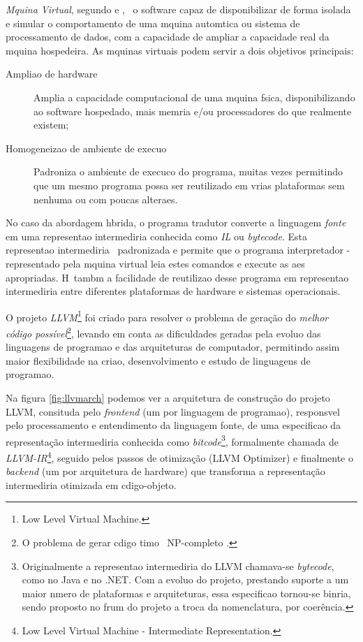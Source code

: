 \emph{M\ah quina Virtual}, segundo \cite{Laureano06} e \cite{IBM11}, \eh\ o software capaz de disponibilizar de forma isolada e  simular o comportamento de uma m\ah quina autom\ah tica ou sistema de processamento de dados, com a capacidade de ampliar a capacidade real da m\ah quina hospedeira.
As m\ah quinas virtuais podem servir a dois objetivos principais:
\begin{description}
\item[Amplia\ca o de hardware] Amplia a capacidade computacional de uma m\ah quina f\ih sica, disponibilizando ao software hospedado, mais mem\oh ria e/ou processadores do que realmente existem;
\item[Homogeneiza\ca o de ambiente de execu\ca o] Padroniza o ambiente de execuc\ca o do programa, muitas vezes permitindo que um mesmo programa possa ser reutilizado em v\ah rias plataformas sem nenhuma ou com poucas altera\co es.
\end{description}

No caso da abordagem h\ih brida, o programa tradutor converte a linguagem \emph{fonte} em uma representa\ca o intermedi\ah ria conhecida como \emph{IL} ou \emph{bytecode}. Esta representa\ca o intermedi\ah ria \eh\ padronizada e permite que o programa interpretador - representado pela m\ah quina virtual leia estes comandos e execute as a\co es apropriadas. H\ah\ tamb\eh m a facilidade de reutiliza\ca o desse programa em representa\ca o intermedi\ah ria entre diferentes plataformas de hardware e sistemas operacionais.

O projeto \emph{LLVM}\footnote{Low Level Virtual Machine.} foi criado para resolver o problema de geração do \emph{melhor código possível}\footnote{O problema de gerar c\oh digo \oh timo \eh\ NP-completo \cite{Aho08}.}, levando em conta as dificuldades geradas pela evolu\ca o das linguagens de programa\ca o e das arquiteturas de computador, permitindo assim maior flexibilidade na cria\ca o, desenvolvimento e estudo de linguagens de programa\ca o.

Na figura \ref{fig:llvmarch} podemos ver a arquitetura de construção do projeto LLVM, consitu\ih da pelo \emph{frontend} (um por linguagem de programa\ca o), respons\ah vel pelo processamento e entendimento da linguagem fonte, de uma especifica\ca o da representação intermedi\ah ria conhecida como \emph{bitcode}\footnote{Originalmente a representa\ca o intermedi\ah ria do LLVM chamava-se \emph{bytecode}, como no Java e no .NET. Com a evolu\ca o do projeto, prestando suporte a um maior n\uh mero de plataformas e arquiteturas, essa especifica\ca o tornou-se bin\ah ria, sendo proposto no f\oh rum do projeto a troca da nomenclatura, por coer\^encia.}, formalmente chamada de \emph{LLVM-IR}\footnote{Low Level Virtual Machine - Intermediate Representation.}, seguido pelos passos de otimização (LLVM Optimizer) e finalmente o \emph{backend} (um por arquitetura de hardware) que transforma a representação intermedi\ah ria otimizada em c\oh digo-objeto.

